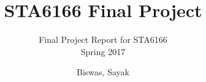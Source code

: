 \documentclass{scrartcl}
\begin{document}
\title{STA6166 Final Project}
\author{Biswas, Sayak}
\subtitle{Final Project Report for STA6166\\Spring 2017}
\maketitle
\end{document}
